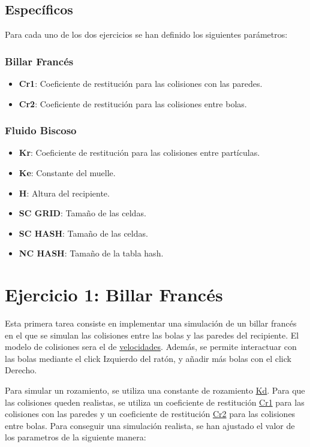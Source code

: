 \documentclass{article}
\begin{document}
\subsection{Específicos}
Para cada uno de los dos ejercicios se han definido los siguientes parámetros:
\subsubsection{Billar Francés}\label{sec:parametros-bf}
\begin{itemize}
    \item \textbf{Cr1}: Coeficiente de restitución para las colisiones con las paredes.
    \item \textbf{Cr2}: Coeficiente de restitución para las colisiones entre bolas.
\end{itemize}

\subsubsection{Fluido Biscoso}\label{sec:parametros-fb}

\begin{itemize}
    \item \textbf{Kr}: Coeficiente de restitución para las colisiones entre partículas.
    \item \textbf{Ke}: Constante del muelle.
    \item \textbf{H}: Altura del recipiente.
    \item \textbf{SC GRID}: Tamaño de las celdas.
    \item \textbf{SC HASH}: Tamaño de las celdas.
    \item \textbf{NC HASH}: Tamaño de la tabla hash.
\end{itemize}

\section{Ejercicio 1: Billar Francés}\label{sec:billar-frances}

Esta primera tarea consiste en implementar una simulación de un billar francés en el que se simulan las colisiones entre las bolas y las paredes del recipiente. El modelo de colisiones sera el de \hyperref[sec:particula-particula]{velocidades}. Además, se permite interactuar con las bolas mediante el click Izquierdo del ratón, y añadir más bolas con el click Derecho.

Para simular un rozamiento, se utiliza una constante de rozamiento \hyperref[sec:parametros]{Kd}. Para que las colisiones queden realistas, se utiliza un coeficiente de restitución \hyperref[sec:parametros]{Cr1} para las colisiones con las paredes y un coeficiente de restitución \hyperref[sec:parametros]{Cr2} para las colisiones entre bolas. Para conseguir una simulación realista, se han  ajustado el valor de los parametros de la siguiente manera:
\end{document}
